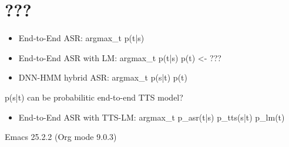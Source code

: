 \documentclass{ltjsarticle}
\begin{document}
\section*{???}
\label{sec:orga22fc8a}

\begin{itemize}
\item End-to-End ASR:         argmax\_t p(t|s)
\item End-to-End ASR with LM: argmax\_t p(t|s) p(t)  <- ???
\item DNN-HMM hybrid ASR:     argmax\_t p(s|t) p(t)
\end{itemize}

p(s|t) can be probabilitic end-to-end TTS model?

\begin{itemize}
\item End-to-End ASR with TTS-LM:  argmax\_t p\_asr(t|s) p\_tts(s|t) p\_lm(t)
\end{itemize}
Emacs 25.2.2 (Org mode 9.0.3)
\end{document}
